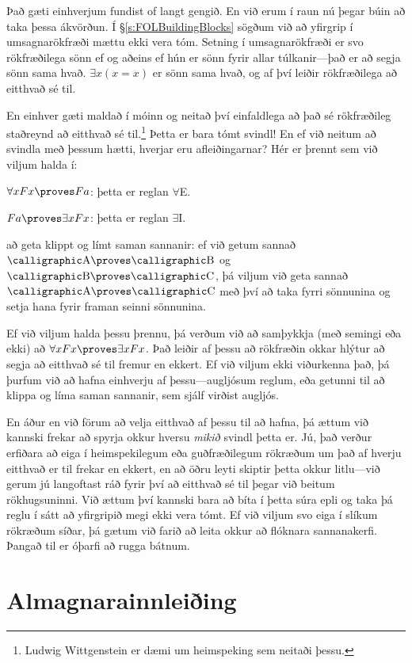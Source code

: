 Það gæti einhverjum fundist of langt gengið. En við erum í raun nú þegar búin að taka þessa ákvörðun. Í \S\ref{s:FOLBuildingBlocks} sögðum við að yfirgrip í umsagnarökfræði mættu ekki vera tóm. Setning í umsagnarökfræði er svo rökfræðilega sönn ef og aðeins ef hún er sönn fyrir allar túlkanir---það er að segja sönn sama hvað. $\exists x(x = x)$ er sönn sama hvað, og af því leiðir rökfræðilega að eitthvað sé til.

En einhver gæti maldað í móinn og neitað því einfaldlega að það sé rökfræðileg staðreynd að eitthvað sé til.\footnote{Ludwig Wittgenstein er dæmi um heimspeking sem neitaði þessu.} Þetta er bara tómt svindl! En ef við neitum að svindla með þessum hætti, hverjar eru afleiðingarnar? Hér er þrennt sem við viljum halda í:
 	\begin{ebullet}
		\item $\forall x Fx \proves Fa$: þetta er reglan $\forall$E.
		\item $Fa \proves \exists x Fx$: þetta er reglan $\exists$I.
		\item að geta klippt og límt saman sannanir: ef við getum sannað $\meta{A} \proves \meta{B}$ og $\meta{B} \proves \meta{C}$, þá viljum við geta sannað $\meta{A} \proves \meta{C}$ með því að taka fyrri sönnunina og setja hana fyrir framan seinni sönnunina.
	\end{ebullet}
Ef við viljum halda þessu þrennu, þá verðum við að samþykkja (með semingi eða ekki) að $\forall xFx \proves \exists x Fx$. Það leiðir af þessu að rökfræðin okkar hlýtur að segja að eitthvað sé til fremur en ekkert. Ef við viljum ekki viðurkenna það, þá þurfum við að hafna einhverju af þessu---augljósum reglum, eða getunni til að klippa og líma saman sannanir, sem sjálf virðist augljós.
	
En áður en við förum að velja eitthvað af þessu til að hafna, þá ættum við kannski frekar að spyrja okkur hversu \emph{mikið} svindl þetta er. Jú, það verður erfiðara að eiga í heimspekilegum eða guðfræðilegum rökræðum um það af hverju eitthvað er til frekar en ekkert, en að öðru leyti skiptir þetta okkur litlu---við gerum jú langoftast ráð fyrir því að eitthvað sé til þegar við beitum rökhugsuninni. Við ættum því kannski bara að bíta í þetta súra epli og taka þá reglu í sátt að yfirgripið megi ekki vera tómt. Ef við viljum svo eiga í slíkum rökræðum síðar, þá gætum við farið að leita okkur að flóknara sannanakerfi. Þangað til er óþarfi að rugga bátnum.

\section{Almagnarainnleiðing}

